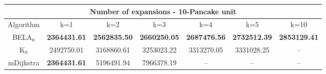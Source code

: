 \begin{tabular}{c|cccccc}\toprule
\multicolumn{7}{c}{Number of expansions - 10-Pancake unit}\\ \midrule
Algorithm & k=1 & k=2 & k=3 & k=4 & k=5 & k=10 \\ \midrule
BELA$_0$ & \textbf{2364431.61} & \textbf{2562835.50} & \textbf{2660250.05} & \textbf{2687476.56} & \textbf{2732512.39} & \textbf{2853129.41} \\
K$_0$ & 2492750.01 & 3168860.61 & 3253023.22 & 3313270.05 & 3331028.25 & -- \\
mDijkstra & \textbf{2364431.61} & 5196491.94 & 7966378.19 & -- & -- & -- \\ \bottomrule 
\end{tabular}
